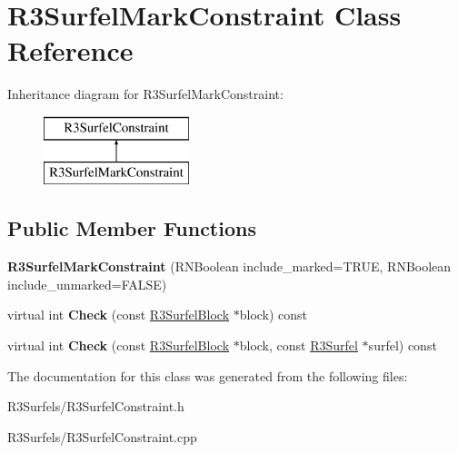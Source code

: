 \hypertarget{class_r3_surfel_mark_constraint}{}\section{R3\+Surfel\+Mark\+Constraint Class Reference}
\label{class_r3_surfel_mark_constraint}
Inheritance diagram for R3\+Surfel\+Mark\+Constraint\+:\begin{figure}[H]
\begin{center}
\leavevmode
\includegraphics[height=2.000000cm]{class_r3_surfel_mark_constraint}
\end{center}
\end{figure}
\subsection*{Public Member Functions}
\begin{DoxyCompactItemize}
\item 
{\bfseries R3\+Surfel\+Mark\+Constraint} (R\+N\+Boolean include\+\_\+marked=T\+R\+UE, R\+N\+Boolean include\+\_\+unmarked=F\+A\+L\+SE)\hypertarget{class_r3_surfel_mark_constraint_aa2f3e814e1c7a44b083260aa28946b5e}{}\label{class_r3_surfel_mark_constraint_aa2f3e814e1c7a44b083260aa28946b5e}

\item 
virtual int {\bfseries Check} (const \hyperlink{class_r3_surfel_block}{R3\+Surfel\+Block} $\ast$block) const \hypertarget{class_r3_surfel_mark_constraint_aaf1d905f4d30301ce91b3da0432a8f66}{}\label{class_r3_surfel_mark_constraint_aaf1d905f4d30301ce91b3da0432a8f66}

\item 
virtual int {\bfseries Check} (const \hyperlink{class_r3_surfel_block}{R3\+Surfel\+Block} $\ast$block, const \hyperlink{class_r3_surfel}{R3\+Surfel} $\ast$surfel) const \hypertarget{class_r3_surfel_mark_constraint_aab0b25bdb8912452c8083eebf0c35df6}{}\label{class_r3_surfel_mark_constraint_aab0b25bdb8912452c8083eebf0c35df6}

\end{DoxyCompactItemize}


The documentation for this class was generated from the following files\+:\begin{DoxyCompactItemize}
\item 
R3\+Surfels/R3\+Surfel\+Constraint.\+h\item 
R3\+Surfels/R3\+Surfel\+Constraint.\+cpp\end{DoxyCompactItemize}
